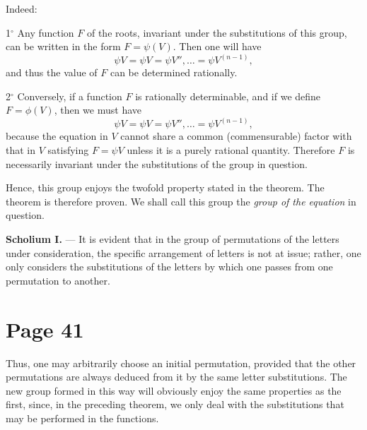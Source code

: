 \documentclass{article}
\begin{document}
\smallskip

Indeed:

\smallskip


1\(^\circ\) Any function \(F\) of the roots, invariant under the substitutions of this group, can be written in the form
$
F = \psi(V).
$
Then one will have
\[
\psi V = \psi V = \psi V'', \dots = \psi V^{(n-1)},
\]
and thus the value of \(F\) can be determined rationally.

\smallskip


2\(^\circ\) Conversely, if a function \(F\) is rationally determinable, and if we define \(F = \phi(V)\), then we must have
\[
\psi V = \psi V = \psi V'', \dots = \psi V^{(n-1)},
\]
because the equation in \(V\) cannot share a common (commensurable) factor with that in \(V\) satisfying \(F = \psi V\) unless it is a purely rational quantity. Therefore \(F\) is necessarily invariant under the substitutions of the group in question.

\smallskip

\noindent
Hence, this group enjoys the twofold property stated in the theorem. The theorem is therefore proven. We shall call this group the \emph{group of the equation} in question.

\medskip

\noindent
\textbf{Scholium I.} --- It is evident that in the group of permutations of the letters under consideration, the specific arrangement of letters is not at issue; rather, one only considers the substitutions of the letters by which one passes from one permutation to another.



\section*{Page 41}

Thus, one may arbitrarily choose an initial permutation, provided that the other permutations are always deduced from it by the same letter substitutions. The new group formed in this way will obviously enjoy the same properties as the first, since, in the preceding theorem, we only deal with the substitutions that may be performed in the functions.
\end{document}
